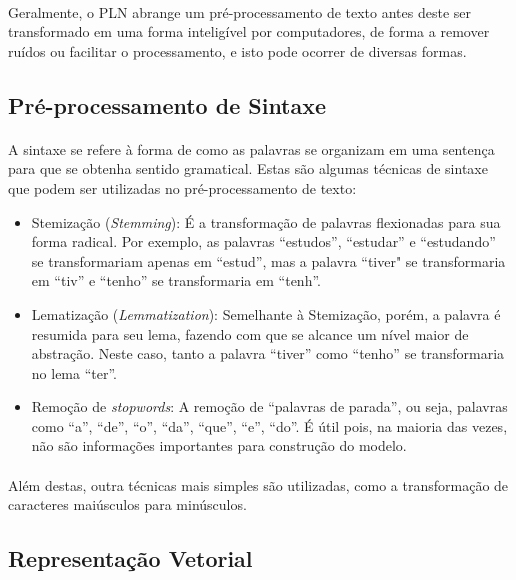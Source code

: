 \documentclass[grad,numbers]{coppe}
\begin{document}
	  \paragraph{}Geralmente, o PLN abrange um pré-processamento de texto antes deste ser transformado em uma forma inteligível por computadores, de forma a remover ruídos ou facilitar o processamento, e isto pode ocorrer de diversas formas.
	  \subsection{Pré-processamento de Sintaxe}
	  	\paragraph{}A sintaxe se refere à forma de como as palavras se organizam em uma sentença para que se obtenha sentido gramatical. Estas são algumas técnicas de sintaxe que podem ser utilizadas no pré-processamento de texto:
	  	\begin{itemize}
	  		\item Stemização (\textit{Stemming}): É a transformação de palavras flexionadas para sua forma radical. Por exemplo, as palavras ``estudos'', ``estudar'' e ``estudando'' se transformariam apenas em ``estud'', mas a palavra ``tiver" se transformaria em ``tiv'' e ``tenho'' se transformaria em ``tenh''.
	  		\item Lematização (\textit{Lemmatization}): Semelhante à Stemização, porém, a palavra é resumida para seu lema, fazendo com que se alcance um nível maior de abstração. Neste caso, tanto a palavra ``tiver'' como ``tenho'' se transformaria no lema  ``ter''.
	  		\item Remoção de \textit{stopwords}: A remoção de ``palavras de parada'', ou seja, palavras como ``a'', ``de'', ``o'', ``da'', ``que'', ``e'', ``do''. É útil pois, na maioria das vezes, não são informações importantes para construção do modelo.
	  	\end{itemize}
  	\paragraph{}Além destas, outra técnicas mais simples são utilizadas, como a transformação de caracteres maiúsculos para minúsculos.
  	\subsection{Representação Vetorial}
\end{document}

